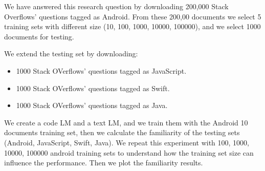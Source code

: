 \documentclass[12pt,mscthesis]{usiinfthesis}
\begin{document}
		We have answered this research question by downloading 200,000 Stack Overflows' questions tagged as Android. From these 200,00 documents we select 5 training sets with different size (10, 100, 1000, 10000, 100000), and we select 1000 documents for testing.


		We extend the testing set by downloading: 
		\begin{itemize}
			\item 1000 Stack OVerflows' questions tagged as JavaScript.
			\item 1000 Stack OVerflows' questions tagged as Swift.
			\item 1000 Stack OVerflows' questions tagged as Java.
		\end{itemize}

		We create a code LM and a text LM, and we train them with the Android 10 documents training set, then we calculate the familiarity of the testing sets
		(Android, JavaScript, Swift, Java). We repeat this experiment with 100, 1000, 10000, 100000 android training sets to understand how the training set size can influence the performance. Then we plot the familiarity results.\\
\end{document}
